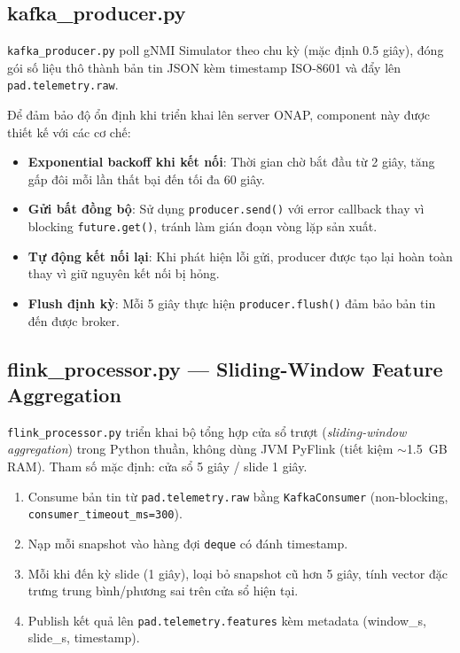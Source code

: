 \documentclass[12pt,a4paper]{article}
\begin{document}
\subsection{kafka\_producer.py}

\texttt{kafka\_producer.py} poll gNMI Simulator theo chu kỳ (mặc định 0.5 giây), đóng gói số liệu thô thành bản tin JSON kèm timestamp ISO-8601 và đẩy lên \texttt{pad.telemetry.raw}.

Để đảm bảo độ ổn định khi triển khai lên server ONAP, component này được thiết kế với các cơ chế:

\begin{itemize}[leftmargin=2em]
\item \textbf{Exponential backoff khi kết nối}: Thời gian chờ bắt đầu từ 2 giây, tăng gấp đôi mỗi lần thất bại đến tối đa 60 giây.
\item \textbf{Gửi bất đồng bộ}: Sử dụng \texttt{producer.send()} với error callback thay vì blocking \texttt{future.get()}, tránh làm gián đoạn vòng lặp sản xuất.
\item \textbf{Tự động kết nối lại}: Khi phát hiện lỗi gửi, producer được tạo lại hoàn toàn thay vì giữ nguyên kết nối bị hỏng.
\item \textbf{Flush định kỳ}: Mỗi 5 giây thực hiện \texttt{producer.flush()} đảm bảo bản tin đến được broker.
\end{itemize}

\subsection{flink\_processor.py --- Sliding-Window Feature Aggregation}

\texttt{flink\_processor.py} triển khai bộ tổng hợp cửa sổ trượt (\textit{sliding-window aggregation}) trong Python thuần, không dùng JVM PyFlink (tiết kiệm $\sim$1.5~GB RAM). Tham số mặc định: cửa sổ 5 giây / slide 1 giây.

\begin{enumerate}[leftmargin=2em]
\item Consume bản tin từ \texttt{pad.telemetry.raw} bằng \texttt{KafkaConsumer} (non-blocking, \texttt{consumer\_timeout\_ms=300}).
\item Nạp mỗi snapshot vào hàng đợi \texttt{deque} có đánh timestamp.
\item Mỗi khi đến kỳ slide (1 giây), loại bỏ snapshot cũ hơn 5 giây, tính vector đặc trưng trung bình/phương sai trên cửa sổ hiện tại.
\item Publish kết quả lên \texttt{pad.telemetry.features} kèm metadata (window\_s, slide\_s, timestamp).
\end{enumerate}
\end{document}
